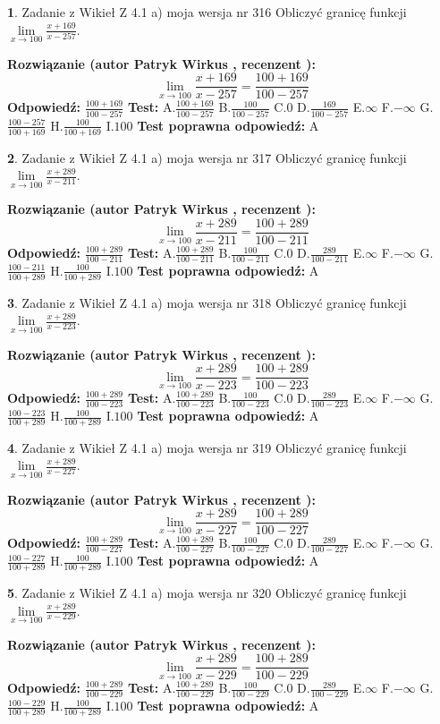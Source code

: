 \documentclass[12pt, a4paper]{article}
\theoremstyle{definition} %
\newtheorem{zad}{}
\newcommand{\zadStart}[1]{\begin{zad}#1\newline}
\newcommand{\zadStop}{\end{zad}}
\newcommand{\rozwStart}[2]{\noindent \textbf{Rozwiązanie (autor #1 , recenzent #2): }\newline}
\newcommand{\rozwStop}{\newline}
\newcommand{\odpStart}{\noindent \textbf{Odpowiedź:}\newline}
\newcommand{\odpStop}{\newline}
\newcommand{\testStart}{\noindent \textbf{Test:}\newline}
\newcommand{\testStop}{\newline}
\newcommand{\kluczStart}{\noindent \textbf{Test poprawna odpowiedź:}\newline}
\newcommand{\kluczStop}{\newline}
\begin{document}
\zadStart{Zadanie z Wikieł Z 4.1 a) moja wersja nr 316}
Obliczyć granicę funkcji $\lim\limits_{x\to100}\frac{x+169}{x-257}$.
\zadStop
\rozwStart{Patryk Wirkus}{}
$$\lim\limits_{x\to100}\frac{x+169}{x-257} = \frac{100+169}{100-257}$$
\rozwStop
\odpStart
$\frac{100+169}{100-257}$
\odpStop
\testStart
A.$\frac{100+169}{100-257}$
B.$\frac{100}{100-257}$
C.$0$
D.$\frac{169}{100-257}$
E.$\infty$
F.$-\infty$
G.$\frac{100-257}{100+169}$
H.$\frac{100}{100+169}$
I.$100$
\testStop
\kluczStart
A
\kluczStop



\zadStart{Zadanie z Wikieł Z 4.1 a) moja wersja nr 317}
Obliczyć granicę funkcji $\lim\limits_{x\to100}\frac{x+289}{x-211}$.
\zadStop
\rozwStart{Patryk Wirkus}{}
$$\lim\limits_{x\to100}\frac{x+289}{x-211} = \frac{100+289}{100-211}$$
\rozwStop
\odpStart
$\frac{100+289}{100-211}$
\odpStop
\testStart
A.$\frac{100+289}{100-211}$
B.$\frac{100}{100-211}$
C.$0$
D.$\frac{289}{100-211}$
E.$\infty$
F.$-\infty$
G.$\frac{100-211}{100+289}$
H.$\frac{100}{100+289}$
I.$100$
\testStop
\kluczStart
A
\kluczStop



\zadStart{Zadanie z Wikieł Z 4.1 a) moja wersja nr 318}
Obliczyć granicę funkcji $\lim\limits_{x\to100}\frac{x+289}{x-223}$.
\zadStop
\rozwStart{Patryk Wirkus}{}
$$\lim\limits_{x\to100}\frac{x+289}{x-223} = \frac{100+289}{100-223}$$
\rozwStop
\odpStart
$\frac{100+289}{100-223}$
\odpStop
\testStart
A.$\frac{100+289}{100-223}$
B.$\frac{100}{100-223}$
C.$0$
D.$\frac{289}{100-223}$
E.$\infty$
F.$-\infty$
G.$\frac{100-223}{100+289}$
H.$\frac{100}{100+289}$
I.$100$
\testStop
\kluczStart
A
\kluczStop



\zadStart{Zadanie z Wikieł Z 4.1 a) moja wersja nr 319}
Obliczyć granicę funkcji $\lim\limits_{x\to100}\frac{x+289}{x-227}$.
\zadStop
\rozwStart{Patryk Wirkus}{}
$$\lim\limits_{x\to100}\frac{x+289}{x-227} = \frac{100+289}{100-227}$$
\rozwStop
\odpStart
$\frac{100+289}{100-227}$
\odpStop
\testStart
A.$\frac{100+289}{100-227}$
B.$\frac{100}{100-227}$
C.$0$
D.$\frac{289}{100-227}$
E.$\infty$
F.$-\infty$
G.$\frac{100-227}{100+289}$
H.$\frac{100}{100+289}$
I.$100$
\testStop
\kluczStart
A
\kluczStop



\zadStart{Zadanie z Wikieł Z 4.1 a) moja wersja nr 320}
Obliczyć granicę funkcji $\lim\limits_{x\to100}\frac{x+289}{x-229}$.
\zadStop
\rozwStart{Patryk Wirkus}{}
$$\lim\limits_{x\to100}\frac{x+289}{x-229} = \frac{100+289}{100-229}$$
\rozwStop
\odpStart
$\frac{100+289}{100-229}$
\odpStop
\testStart
A.$\frac{100+289}{100-229}$
B.$\frac{100}{100-229}$
C.$0$
D.$\frac{289}{100-229}$
E.$\infty$
F.$-\infty$
G.$\frac{100-229}{100+289}$
H.$\frac{100}{100+289}$
I.$100$
\testStop
\kluczStart
A
\kluczStop
\end{document}
